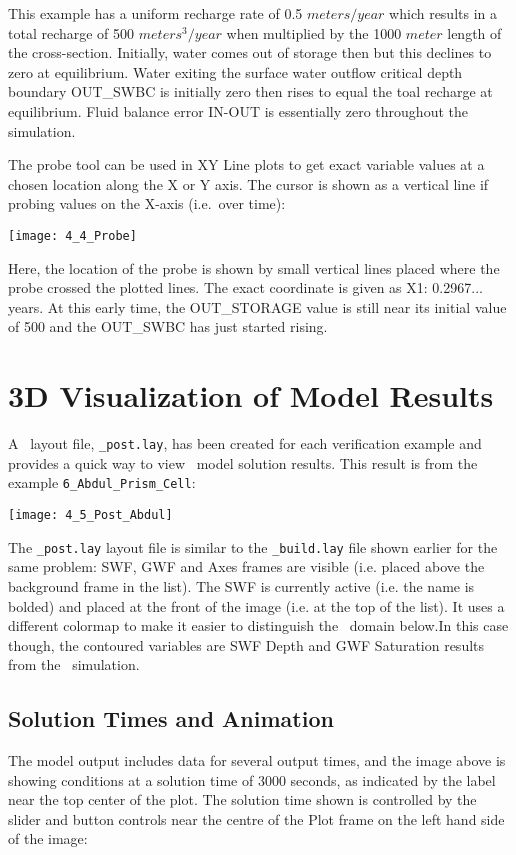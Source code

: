 This example has a uniform recharge rate of 0.5 $meters/year$ which results in a total recharge of 500 $meters^{3}/year$ when multiplied by the 1000 $meter$ length of the cross-section. Initially, water comes out of storage then but this declines to zero at equilibrium.  Water exiting the surface water outflow critical depth boundary  {\sf OUT\_SWBC} is initially zero then rises to equal the toal recharge at equilibrium.  Fluid balance error {\sf IN-OUT} is essentially zero throughout the simulation.

The probe tool can be used in {\sf XY Line} plots to get exact variable values at a chosen location along the X or Y axis.  The cursor is shown as a vertical line if probing values on the X-axis (i.e.\ over time):

        \texttt{[image: 4\_4\_Probe]}

Here, the location of the probe is shown by small vertical lines placed where the probe crossed the plotted lines.  The exact coordinate is given as {\sf X1: 0.2967...}  years.  At this early time, the {\sf OUT\_STORAGE} value is still near its initial value of 500 and the {\sf OUT\_SWBC} has just started rising.

\section{3D Visualization of Model Results}
A \tecplot\ layout file, \texttt{\_post.lay}, has been created for each verification example and  provides a quick way to view \mfus\ model solution results.  This result is from the example {\tt 6\_Abdul\_Prism\_Cell}:

        \texttt{[image: 4\_5\_Post\_Abdul]}

The {\tt \_post.lay} layout file is similar to the {\tt \_build.lay} file shown earlier for the same problem: {\sf  SWF, GWF} and {\sf Axes} frames are visible (i.e. placed above the {\sf background} frame in the list).  The {\sf SWF} is currently active (i.e. the name is bolded) and placed at the front of the image (i.e. at the top of the list). It uses a different colormap to make it easier to distinguish the \gwf\ domain below.In this case though, the contoured variables are {\sf SWF Depth} and {\sf GWF Saturation} results from the \mfus\ simulation.

\subsection{Solution Times and Animation}
The model output includes data for several output times, and the image above is showing conditions at a solution time of 3000 seconds, as indicated by the label near the top center of the plot.  The solution time shown is controlled by the slider and button controls near the centre of the {\sf Plot} frame on the left hand side of the image:

